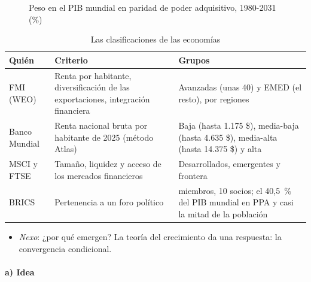 \documentclass[11pt]{article}
\begin{document}
\begin{figure}[H]
\centering
\caption{Peso en el PIB mundial en paridad de poder adquisitivo, 1980-2031 (\%)}\label{fig:peso-pib-ppa}
\end{figure}

\begin{table}[H]
\centering
\caption{Las clasificaciones de las economías}\label{tab:clasificaciones}
\small
\begin{tabular}{>{\raggedright\arraybackslash}m{2.6cm}>{\raggedright\arraybackslash}m{5.2cm}>{\raggedright\arraybackslash}m{6.8cm}}
\toprule
\rowcolor{tceeazulpalido} Quién & Criterio & Grupos \\
\midrule
FMI (WEO) & Renta por habitante, diversificación de las exportaciones, integración financiera & Avanzadas (unas 40) y EMED (el resto), por regiones \\
Banco Mundial & Renta nacional bruta por habitante de 2025 (método Atlas) & Baja (hasta 1.175 \$), media-baja (hasta 4.635 \$), media-alta (hasta 14.375 \$) y alta \\
MSCI y FTSE & Tamaño, liquidez y acceso de los mercados financieros & Desarrollados, emergentes y frontera \\
BRICS & Pertenencia a un foro político & 11 miembros, 10 socios; el 40,5~\% del PIB mundial en PPA y casi la mitad de la población \\
\bottomrule
\end{tabular}
\end{table}

\begin{itemize}
\item \emph{Nexo}: ¿por qué emergen? La teoría del crecimiento da una respuesta: la convergencia condicional.
\end{itemize}

\paragraph{a) Idea}
\end{document}
